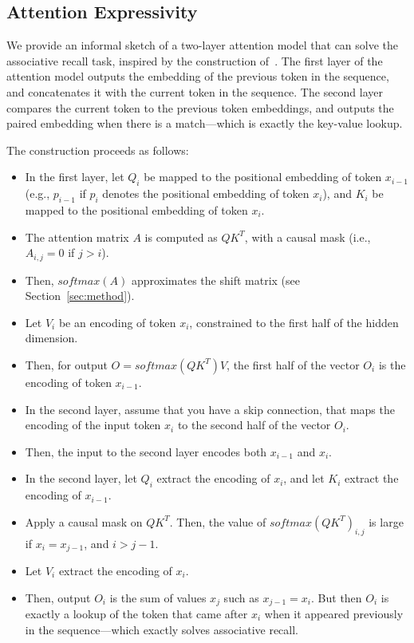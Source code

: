 \subsection{Attention Expressivity}
\label{sec:app_attention_expressivity}
We provide an informal sketch of a two-layer attention model that can solve the associative recall task, inspired by the construction of~\citep{olsson2022context}.
The first layer of the attention model outputs the embedding of the previous token in the sequence, and concatenates it with the current token in the sequence.
The second layer compares the current token to the previous token embeddings, and outputs the paired embedding when there is a match---which is exactly the key-value lookup.

The construction proceeds as follows:
\begin{itemize}
  \item In the first layer, let $Q_i$ be mapped to the positional embedding of token $x_{i-1}$ (e.g., $p_{i-1}$ if $p_i$ denotes the positional embedding of token $x_i$), and $K_i$ be mapped to the positional embedding of token $x_i$.
  \item The attention matrix $A$ is computed as $QK^T$, with a causal mask (i.e., $A_{i, j} = 0$ if $j > i$).
  \item Then, $softmax(A)$ approximates the shift matrix (see Section~\ref{sec:method}).
  \item Let $V_i$ be an encoding of token $x_i$, constrained to the first half of the hidden dimension.
  \item Then, for output $O = softmax(QK^T)V$, the first half of the vector $O_i$ is the encoding of token $x_{i-1}$.
  \item In the second layer, assume that you have a skip connection, that maps the encoding of the input token $x_i$ to the second half of the vector $O_i$.
  \item Then, the input to the second layer encodes both $x_{i-1}$ and $x_i$.
  \item In the second layer, let $Q_i$ extract the encoding of $x_i$, and let $K_i$ extract the encoding of $x_{i-1}$.
  \item Apply a causal mask on $QK^T$. Then, the value of $softmax(QK^T)_{i, j}$ is large if $x_i = x_{j-1}$, and $i > j - 1$.
  \item Let $V_i$ extract the encoding of $x_i$.
  \item Then, output $O_i$ is the sum of values $x_j$ such as $x_{j-1} = x_i$. But then $O_i$ is exactly a lookup of the token that came after $x_i$ when it appeared previously in the sequence---which exactly solves associative recall.
\end{itemize}

